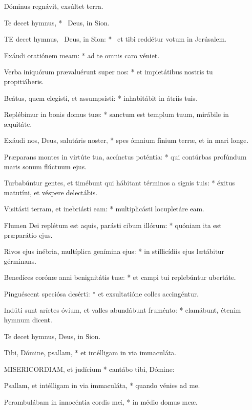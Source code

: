  Dóminus regnávit, exsúltet terra.

 Te decet hymnus, * \textdagger\ Deus, in Sion. \textdaggerdbl


\lettrine[lines=2]{T}{E} decet hymnus, \textdagger\ Deus, in Sion: * \textdaggerdbl\ et tibi reddétur votum in Jerúsalem.

Exáudi oratiónem meam: * ad te omnis caro véniet.

Verba iniquórum prævaluérunt super nos: * et impietátibus nostris tu propitiáberis.

Beátus, quem elegísti, et assumpsísti: * inhabitábit in átriis tuis.

Replébimur in bonis domus tuæ: * sanctum est templum tuum, mirábile in æquitáte.

Exáudi nos, Deus, salutáris noster, * spes ómnium fínium terræ, et in mari longe.

Præparans montes in virtúte tua, accínctus poténtia: * qui contúrbas profúndum maris sonum flúctuum ejus.

Turbabúntur gentes, et timébunt qui hábitant términos a signis tuis: * éxitus matutíni, et véspere delectábis.

Visitásti terram, et inebriásti eam: * multiplicásti locupletáre eam.

Flumen Dei replétum est aquis, parásti cibum illórum: * quóniam ita est præparátio ejus.

Rivos ejus inébria, multíplica genímina ejus: * in stillicídiis ejus lætábitur gérminans.

Benedíces corónæ anni benignitátis tuæ: * et campi tui replebúntur ubertáte.

Pinguéscent speciósa desérti: * et exsultatióne colles accingéntur.

Indúti sunt aríetes óvium, et valles abundábunt fruménto: * clamábunt, étenim hymnum dicent.

 Te decet hymnus, Deus, in Sion.

 Tibi, Dómine, psallam, * et intélligam in via immaculáta.


\lettrine[lines=2]{M}{ISERICORDIAM}, et judícium * cantábo tibi, Dómine:

Psallam, et intélligam in via immaculáta, * quando vénies ad me.

Perambulábam in innocéntia cordis mei, * in médio domus meæ.

